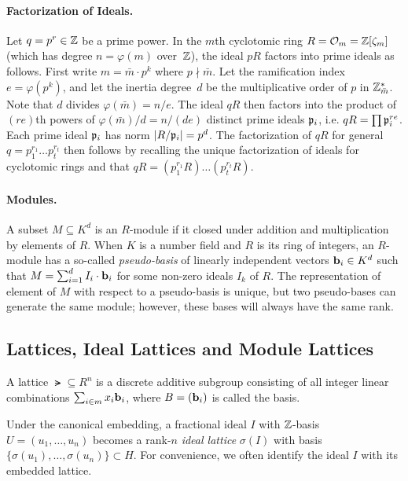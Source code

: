 \paragraph{Factorization of Ideals.}\label{par:ideal-fact} Let $q=p^r \in \mathbb{Z}$ be a prime power.  In the $m$th cyclotomic ring
$R=\mathcal{O}_{m} = \mathbb{Z}[\zeta_{m}]$ (which has degree $n=\varphi(m)$
over~$\mathbb{Z}$), the ideal $pR$ factors into prime ideals as follows. First
write $m = \bar{m}\cdot p^{k}$ where $p \nmid \bar{m}$. Let the
ramification index 
$e = \varphi(p^{k})$, and let the inertia degree~$d$ be the multiplicative order of $p$
in $\mathbb{Z}_{\bar{m}}^{*}$. Note that $d$ divides $\varphi(\bar{m}) =
n/e$.
The ideal $qR$ then factors into the product of $(re)$th powers of
$\varphi(\bar{m})/d = n/(de)$ distinct prime ideals $\mathfrak{p}_{i}$, i.e.
$qR=\prod \mathfrak{p}_{i}^{re}$.  Each prime ideal $\mathfrak{p}_{i}$ has norm
$\lvert R/\mathfrak{p}_{i}\rvert=p^{d}$. The factorization of $qR$ for general
$q=p_1^{r_1}\ldots p_t^{r_t}$ then follows by recalling the unique
factorization of ideals for cyclotomic rings and that
$qR=(p_1^{r_1}R)\ldots(p_t^{r_t}R)$.
\fi

\paragraph{Modules.} A subset $M \subseteq K^d$ is an $R$-module if it
closed under addition and multiplication by elements of $R$. When $K$
is a number field and $R$ is its ring of integers, an $R$-module has a
so-called \emph{pseudo-basis} of linearly independent vectors $\mathbf{b}_i
\in K^d$ such that $M=\sum_{i=1}^{d}I_{i}\cdot \mathbf{b}_i$ for some
non-zero ideals $I_k$ of $R$. The representation of element of $M$
with respect to a pseudo-basis is unique, but two pseudo-bases can
generate the same module; however, these bases will always have the
same rank. 

\iflncs
\else
\subsection{Lattices, Ideal Lattices and Module Lattices}
\label{sec:module-lattices}
A lattice $\lat \subseteq R^n$ is a discrete additive subgroup
consisting of all integer linear combinations $\sum_{i \in
  m}x_i\mathbf{b}_i$, where $B=(\mathbf{b}_i)$ is called the basis.  


Under the canonical embedding, a fractional ideal $I$ with
$\mathbb{Z}$-basis $U=(u_1, \ldots, u_n)$ becomes a rank-$n$ \emph{ideal
  lattice} $\sigma(I)$ with basis $\{\sigma(u_1), \ldots,
\sigma(u_n)\} \subset H$. For convenience, we often identify the ideal
$I$ with its embedded lattice.

